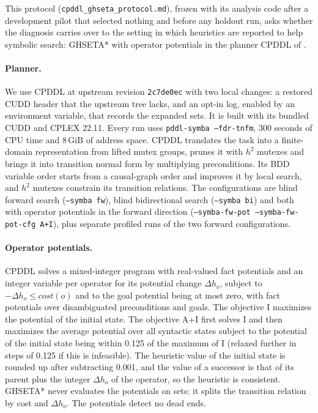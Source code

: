 \documentclass[letterpaper]{article}
\newcommand{\cost}{\ensuremath{\mathit{cost}}}
\theoremstyle{plain}
\theoremstyle{definition}
\theoremstyle{remark}
\begin{document}
This protocol (\texttt{cpddl\_\allowbreak ghseta\_\allowbreak protocol.md}), frozen with its
analysis code after a development pilot that selected nothing and before any
holdout run, asks whether the diagnosis carries over to the setting in which
heuristics are reported to help symbolic search: GHSETA* with operator
potentials in the planner CPDDL of \citet{fiser-et-al-aij2024}.

\paragraph{Planner.}
We use CPDDL at upstream revision \texttt{2c7de0ec} with two local changes:
a restored CUDD header that the upstream tree lacks, and an opt-in log,
enabled by an environment variable, that records the expanded sets.  It is
built with its bundled CUDD and CPLEX 22.11.  Every run uses
\texttt{pddl-symba --fdr-tnfm}, 300 seconds of CPU time and 8\,GiB of
address space.  CPDDL translates the task into a finite-domain
representation from lifted mutex groups, prunes it with $h^2$ mutexes and
brings it into transition normal form by multiplying preconditions.  Its
BDD variable order starts from a causal-graph order and improves it by local
search, and $h^2$ mutexes constrain its transition relations.  The
configurations are blind forward search (\texttt{--symba fw}), blind
bidirectional search (\texttt{--symba bi}) and both with operator potentials
in the forward direction (\texttt{--symba-fw-pot --symba-fw-pot-cfg A+I}),
plus separate profiled runs of the two forward configurations.

\paragraph{Operator potentials.}
CPDDL solves a mixed-integer program with real-valued fact potentials and an
integer variable per operator for its potential change $\Delta h_o$, subject
to $-\Delta h_o\leq\cost(o)$ and to the goal potential being at most zero,
with fact potentials over disambiguated preconditions and goals.  The
objective I maximizes the potential of the initial state.  The objective A+I
first solves I and then maximizes the average potential over all syntactic
states subject to the potential of the initial state being within 0.125 of
the maximum of I (relaxed further in steps of 0.125 if this is infeasible).
The heuristic value of the initial state is rounded up after subtracting
0.001, and the value of a successor is that of its parent plus the integer
$\Delta h_o$ of the operator, so the heuristic is consistent.  GHSETA* never
evaluates the potentials on sets: it splits the transition relation by cost
and $\Delta h_o$.  The potentials detect no dead ends.
\end{document}
